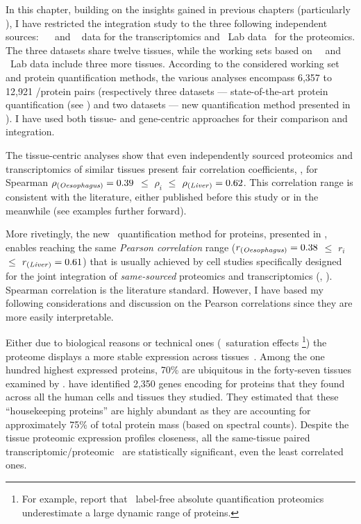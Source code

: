 In this chapter,
building on the insights gained in previous chapters
(particularly ),
I have restricted the integration study to
the three following independent sources:
\uhlen\ \etal{}~
and \gtex~ data for the transcriptomics
and \pandey\ Lab data~ for the proteomics.
The three datasets share twelve tissues,
while the working sets based on \uhlen\ \etal\ and \pandey\ Lab data
include three more tissues.
According to the considered working set and protein quantification methods,
the various analyses encompass 6,357 to 12,921 \mRNA/protein pairs
(respectively
three datasets --- state-of-the-art protein quantification (see )
and two datasets --- new quantification method presented in ).
I have used both tissue- and gene-centric approaches
for their comparison and integration.\mybr\

The tissue-centric analyses show that
even independently sourced proteomics and transcriptomics of similar tissues
present fair correlation coefficients,
\eg, for Spearman $\rho_{\text{(\emph{Oesophagus})}}=0.39$
$≤$ $\rho_i$ $≤$ $\rho_{\text{(\emph{Liver})}}=0.62$.
This correlation range is consistent with the literature,
either published before this study or in the meanwhile (see examples further forward).

More rivetingly,
the new \PPKM\ quantification method for proteins,
presented in ,
enables reaching the same \emph{Pearson correlation} range
($r_{\text{(\emph{Oesophagus})}}=0.38$ $≤$ $r_i$  $≤$ $r_{\text{(\emph{Liver})}}=0.61$)
that is usually achieved by cell studies specifically designed
for the joint integration of \emph{same-sourced} proteomics and transcriptomics
(\eg, \citet{Marguerat2012-sn,schwanhausserglobal:2011,Schwanhausser2013-et,Li2014-ai}).
Spearman correlation is the literature standard.
However, I have based my following considerations and discussion
on the Pearson correlations
since they are more easily interpretable.

Either due to biological reasons or technical ones (\eg\ saturation effects%
\footnote{For example, \citet{TOP3isbetter} report that
\ms\ label-free absolute quantification proteomics underestimate
a large dynamic range of proteins.})
the proteome displays a more stable expression across
tissues~.
Among the one hundred highest expressed proteins,
70\% are ubiquitous in the forty-seven tissues examined by \citet{KusterData}.
\citet{PandeyData} have identified 2,350 genes encoding for proteins
that they found across all the human cells and tissues they studied.
They estimated that these \enquote{housekeeping proteins} are
highly abundant as they are accounting for approximately 75\% of total protein mass
(based on spectral counts).
Despite the tissue proteomic expression profiles closeness,
all the same-tissue paired transcriptomic/proteomic \treps\
are statistically significant, even the least correlated ones.

